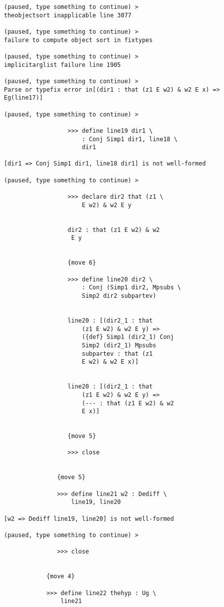 \documentclass[12pt]{article}
\begin{document}
\begin{verbatim}
(paused, type something to continue) >
theobjectsort inapplicable line 3077

(paused, type something to continue) >
failure to compute object sort in fixtypes

(paused, type something to continue) >
implicitarglist failure line 1905

(paused, type something to continue) >
Parse or typefix error in[(dir1 : that (z1 E w2) & w2 E x) => Eg(line17)]

(paused, type something to continue) >

                  >>> define line19 dir1 \
                      : Conj Simp1 dir1, line18 \
                      dir1

[dir1 => Conj Simp1 dir1, line18 dir1] is not well-formed

(paused, type something to continue) >

                  >>> declare dir2 that (z1 \
                      E w2) & w2 E y


                  dir2 : that (z1 E w2) & w2 
                   E y


                  {move 6}

                  >>> define line20 dir2 \
                      : Conj (Simp1 dir2, Mpsubs \
                      Simp2 dir2 subpartev)


                  line20 : [(dir2_1 : that 
                      (z1 E w2) & w2 E y) => 
                      ({def} Simp1 (dir2_1) Conj 
                      Simp2 (dir2_1) Mpsubs 
                      subpartev : that (z1 
                      E w2) & w2 E x)]


                  line20 : [(dir2_1 : that 
                      (z1 E w2) & w2 E y) => 
                      (--- : that (z1 E w2) & w2 
                      E x)]


                  {move 5}

                  >>> close


               {move 5}

               >>> define line21 w2 : Dediff \
                   line19, line20

[w2 => Dediff line19, line20] is not well-formed

(paused, type something to continue) >

               >>> close


            {move 4}

            >>> define line22 thehyp : Ug \
                line21


\end{verbatim}
\end{document}
